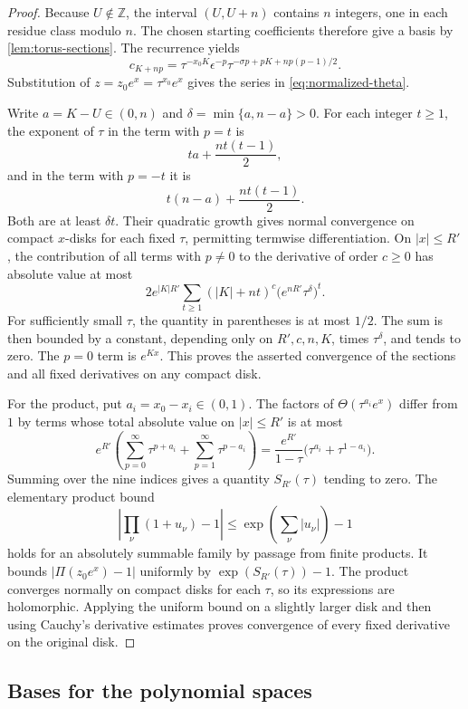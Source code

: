 \begin{proof}
Because $U\notin\mathbb{Z}$, the interval $(U,U+n)$ contains $n$ integers, one in each residue class modulo $n$. The chosen starting coefficients therefore give a basis by \cref{lem:torus-sections}. The recurrence yields
\[
 c_{K+np}=\tau^{-x_0K}\epsilon^{-p}
             \tau^{-\sigma p+pK+np(p-1)/2}.
\]
Substitution of $z=z_0e^x=\tau^{x_0}e^x$ gives the series in \eqref{eq:normalized-theta}.

Write $a=K-U\in(0,n)$ and $\delta=\min\{a,n-a\}>0$. For each integer $t\geq1$, the exponent of $\tau$ in the term with $p=t$ is
\[
 ta+\frac{nt(t-1)}2,
\]
and in the term with $p=-t$ it is
\[
 t(n-a)+\frac{nt(t-1)}2.
\]
Both are at least $\delta t$. Their quadratic growth gives normal convergence on compact $x$-disks for each fixed $\tau$, permitting termwise differentiation. On $|x|\leq R'$, the contribution of all terms with $p\neq0$ to the derivative of order $c\geq0$ has absolute value at most
\[
 2e^{|K|R'}\sum_{t\geq1}(|K|+nt)^c
              \bigl(e^{nR'}\tau^\delta\bigr)^t.
\]
For sufficiently small $\tau$, the quantity in parentheses is at most $1/2$. The sum is then bounded by a constant, depending only on $R',c,n,K$, times $\tau^\delta$, and tends to zero. The $p=0$ term is $e^{Kx}$. This proves the asserted convergence of the sections and all fixed derivatives on any compact disk.

For the product, put $a_i=x_0-x_i\in(0,1)$. The factors of $\Theta(\tau^{a_i}e^x)$ differ from $1$ by terms whose total absolute value on $|x|\leq R'$ is at most
\[
 e^{R'}\left(\sum_{p=0}^\infty\tau^{p+a_i}
                  +\sum_{p=1}^\infty\tau^{p-a_i}\right)
 =\frac{e^{R'}}{1-\tau}
                  \bigl(\tau^{a_i}+\tau^{1-a_i}\bigr).
\]
Summing over the nine indices gives a quantity $S_{R'}(\tau)$ tending to zero. The elementary product bound
\[
 \left|\prod_\nu(1+u_\nu)-1\right|
       \leq\exp\left(\sum_\nu|u_\nu|\right)-1
\]
holds for an absolutely summable family by passage from finite products. It bounds $|\Pi(z_0e^x)-1|$ uniformly by $\exp(S_{R'}(\tau))-1$. The product converges normally on compact disks for each $\tau$, so its expressions are holomorphic. Applying the uniform bound on a slightly larger disk and then using Cauchy's derivative estimates proves convergence of every fixed derivative on the original disk.
\end{proof}

\subsection{Bases for the polynomial spaces}

